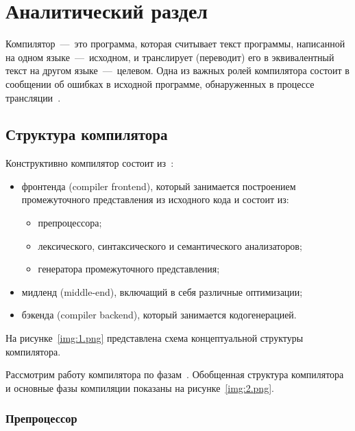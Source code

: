 \section{Аналитический раздел}

Компилятор~---~это программа, которая считывает текст программы, написанной на одном языке~---~исходном, и транслирует (переводит) его в эквивалентный текст на другом языке~---~целевом. Одна из важных ролей компилятора состоит в сообщении об ошибках в исходной программе, обнаруженных в процессе трансляции~\cite{aho2003}.

\subsection{Структура компилятора}

Конструктивно компилятор состоит из~\cite{vladimirtov2004struct,grune2012modern}:
\begin{itemize}
    \item фронтенда (compiler frontend), который занимается построением промежуточного представления из исходного кода и состоит из:
    \begin{itemize}
        \item препроцессора; 
        \item лексического, синтаксического и семантического анализаторов;
        \item генератора промежуточного представления;
    \end{itemize}
    \item мидленд (middle-end), включащий в себя различные оптимизации;
    \item бэкенда (compiler backend), который занимается кодогенерацией.
\end{itemize}

На рисунке~\ref{img:1.png} представлена схема концептуальной структуры компилятора.

Рассмотрим работу компилятора по фазам~\cite{serebrykov2001}. Обобщенная структура компилятора и основные фазы компиляции показаны на рисунке~\ref{img:2.png}.


\subsubsection{Препроцессор}

